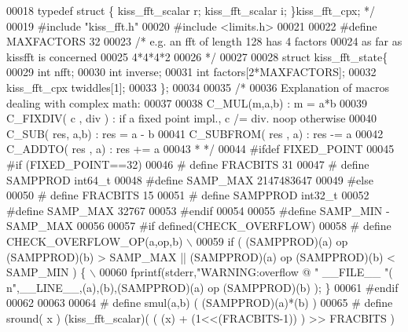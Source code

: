 \begin{DoxyCode}
00018 \textcolor{comment}{   typedef struct \{ kiss\_fft\_scalar r; kiss\_fft\_scalar i; \}kiss\_fft\_cpx; */}
00019 \textcolor{preprocessor}{#include "kiss_fft.h"}
00020 \textcolor{preprocessor}{#include <limits.h>}
00021 
00022 \textcolor{preprocessor}{#define MAXFACTORS 32}
00023 \textcolor{comment}{/* e.g. an fft of length 128 has 4 factors }
00024 \textcolor{comment}{ as far as kissfft is concerned}
00025 \textcolor{comment}{ 4*4*4*2}
00026 \textcolor{comment}{ */}
00027 
00028 \textcolor{keyword}{struct }kiss_fft_state\{
00029     \textcolor{keywordtype}{int} nfft;
00030     \textcolor{keywordtype}{int} inverse;
00031     \textcolor{keywordtype}{int} factors[2*MAXFACTORS];
00032     kiss_fft_cpx twiddles[1];
00033 \};
00034 
00035 \textcolor{comment}{/*}
00036 \textcolor{comment}{  Explanation of macros dealing with complex math:}
00037 \textcolor{comment}{}
00038 \textcolor{comment}{   C\_MUL(m,a,b)         : m = a*b}
00039 \textcolor{comment}{   C\_FIXDIV( c , div )  : if a fixed point impl., c /= div. noop otherwise}
00040 \textcolor{comment}{   C\_SUB( res, a,b)     : res = a - b}
00041 \textcolor{comment}{   C\_SUBFROM( res , a)  : res -= a}
00042 \textcolor{comment}{   C\_ADDTO( res , a)    : res += a}
00043 \textcolor{comment}{ * */}
00044 \textcolor{preprocessor}{#ifdef FIXED\_POINT}
00045 \textcolor{preprocessor}{#if (FIXED\_POINT==32)}
00046 \textcolor{preprocessor}{# define FRACBITS 31}
00047 \textcolor{preprocessor}{# define SAMPPROD int64\_t}
00048 \textcolor{preprocessor}{#define SAMP\_MAX 2147483647}
00049 \textcolor{preprocessor}{#else}
00050 \textcolor{preprocessor}{# define FRACBITS 15}
00051 \textcolor{preprocessor}{# define SAMPPROD int32\_t }
00052 \textcolor{preprocessor}{#define SAMP\_MAX 32767}
00053 \textcolor{preprocessor}{#endif}
00054 
00055 \textcolor{preprocessor}{#define SAMP\_MIN -SAMP\_MAX}
00056 
00057 \textcolor{preprocessor}{#if defined(CHECK\_OVERFLOW)}
00058 \textcolor{preprocessor}{#  define CHECK\_OVERFLOW\_OP(a,op,b)  \(\backslash\)}
00059 \textcolor{preprocessor}{    if ( (SAMPPROD)(a) op (SAMPPROD)(b) > SAMP\_MAX || (SAMPPROD)(a) op (SAMPPROD)(b) < SAMP\_MIN ) \{ \(\backslash\)}
00060 \textcolor{preprocessor}{        fprintf(stderr,"WARNING:overflow @ " \_\_FILE\_\_ "(%
      n",\_\_LINE\_\_,(a),(b),(SAMPPROD)(a) op (SAMPPROD)(b) );  \}}
00061 \textcolor{preprocessor}{#endif}
00062 
00063 
00064 \textcolor{preprocessor}{#   define smul(a,b) ( (SAMPPROD)(a)*(b) )}
00065 \textcolor{preprocessor}{#   define sround( x )  (kiss\_fft\_scalar)( ( (x) + (1<<(FRACBITS-1)) ) >> FRACBITS )}

\end{DoxyCode}
